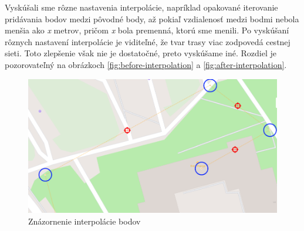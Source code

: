 Vyskúšali sme rôzne nastavenia interpolácie, napríklad opakované iterovanie pridávania bodov medzi pôvodné body, až pokiaľ vzdialenosť medzi bodmi nebola menšia ako \textit{x} metrov, pričom \textit{x} bola premenná, ktorú sme menili. Po vyskúšaní rôznych nastavení interpolácie je viditeľné, že tvar trasy viac zodpovedá cestnej sieti. Toto zlepšenie však nie je dostatočné, preto vyskúšame iné. Rozdiel je pozorovateľný na obrázkoch \ref{fig:before-interpolation} a \ref{fig:after-interpolation}.
\begin{figure}[H]
    \centering
    \includegraphics[width=.7\textwidth]{img/interpolacia bodov/interpolacia bodov.png}
    \caption{Znázornenie interpolácie bodov}
    \label{fig:pts-interpolation}
\end{figure}
